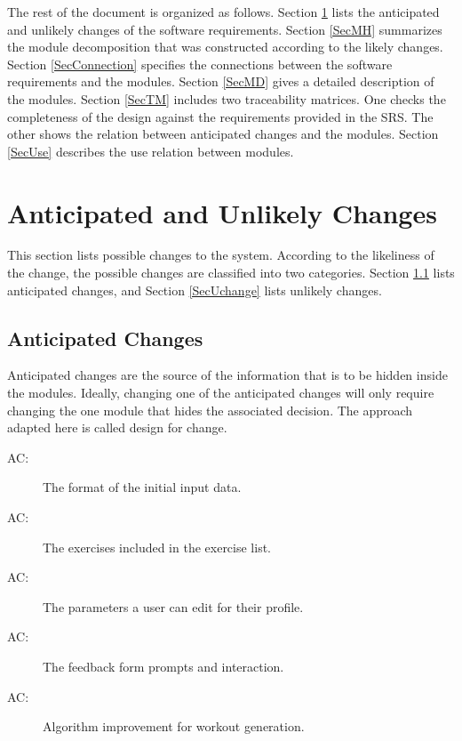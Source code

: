 \documentclass[12pt, titlepage]{article}
\newcounter{acnum}
\newcommand{\actheacnum}{AC\theacnum}
\begin{document}
The rest of the document is organized as follows. Section
\ref{SecChange} lists the anticipated and unlikely changes of the software
requirements. Section \ref{SecMH} summarizes the module decomposition that
was constructed according to the likely changes. Section \ref{SecConnection}
specifies the connections between the software requirements and the
modules. Section \ref{SecMD} gives a detailed description of the
modules. Section \ref{SecTM} includes two traceability matrices. One checks
the completeness of the design against the requirements provided in the SRS. The
other shows the relation between anticipated changes and the modules. Section
\ref{SecUse} describes the use relation between modules.

\section{Anticipated and Unlikely Changes} \label{SecChange}

This section lists possible changes to the system. According to the likeliness
of the change, the possible changes are classified into two
categories. Section \ref{SecAchange} lists anticipated changes, and Section \ref{SecUchange} lists unlikely changes.

\subsection{Anticipated Changes} \label{SecAchange}

Anticipated changes are the source of the information that is to be hidden
inside the modules. Ideally, changing one of the anticipated changes will only
require changing the one module that hides the associated decision. The approach
adapted here is called design for
change.

\begin{description}
\item[ \actheacnum \label{acInput}:] The format of the
  initial input data.
\item[ \actheacnum \label{acExercise}:] The exercises included in the exercise list.
\item[ \actheacnum \label{acProfile}:] The parameters a user can edit for their profile.
\item[ \actheacnum \label{acFeedback}:] The feedback form prompts and interaction.
\item[ \actheacnum \label{acAlgorithm}:] Algorithm improvement for workout generation.
\end{description}
\end{document}
